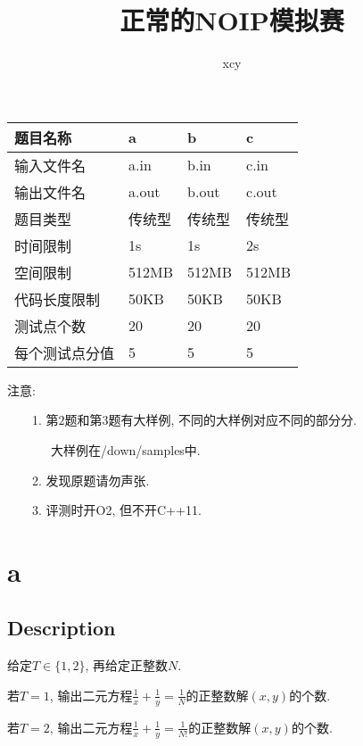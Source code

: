 \documentclass[UTF8, 11pt]{ctexart}
\begin{document}
\pagestyle{fancy}
\renewcommand{\headrulewidth}{0.4pt}
\date{}
\title{正常的NOIP模拟赛}
\author{xcy}

\begin{CJK}{UTF8}{gkai}
\begin{spacing}{1.2}
    \maketitle
    \begin{center}
    \begin{tabular}{|p{4cm}|p{3cm}|p{3cm}|p{3cm}|}
        \hline
        题目名称 & a & b & c \\
		\hline
        输入文件名 & a.in & b.in & c.in \\
        \hline
        输出文件名 & a.out & b.out & c.out \\
        \hline
        题目类型 & 传统型 & 传统型 & 传统型 \\
        \hline
        时间限制 & 1s & 1s & 2s \\
        \hline
        空间限制 & 512MB & 512MB & 512MB \\
        \hline
        代码长度限制 & 50KB & 50KB & 50KB \\
		\hline
        测试点个数 & 20 & 20 & 20 \\
		\hline
		每个测试点分值 & 5 & 5 & 5 \\
        \hline
	\end{tabular}
	\end{center}

	注意: 


	\ \ \ \ 1. 第$2$题和第$3$题有大样例, 不同的大样例对应不同的部分分.
	
	\ \ \ \ \ \ \ 大样例在/down/samples中.

	\ \ \ \ 2. 发现原题请勿声张.

	\ \ \ \ 3. 评测时开O2, 但不开C++11.

	\newpage
	\section{a}
		\subsection{Description}
			给定$T\in\{1,2\}$, 再给定正整数$N$.

			若$T=1$, 输出二元方程$\frac{1}{x}+\frac{1}{y}=\frac{1}{N}$的正整数解$(x,y)$的个数.

			若$T=2$, 输出二元方程$\frac{1}{x}+\frac{1}{y}=\frac{1}{N!}$的正整数解$(x,y)$的个数.


\end{spacing}
\end{CJK}
\end{document}

